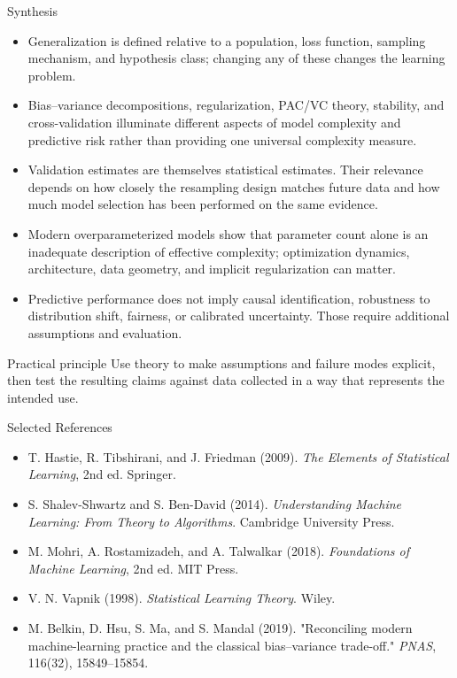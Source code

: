 \documentclass[aspectratio=169,11pt]{beamer}
\begin{document}
\begin{frame}{Synthesis}
  \begin{itemize}
    \item Generalization is defined relative to a population, loss function, sampling mechanism, and hypothesis class; changing any of these changes the learning problem.
    \item Bias--variance decompositions, regularization, PAC/VC theory, stability, and cross-validation illuminate different aspects of model complexity and predictive risk rather than providing one universal complexity measure.
    \item Validation estimates are themselves statistical estimates. Their relevance depends on how closely the resampling design matches future data and how much model selection has been performed on the same evidence.
    \item Modern overparameterized models show that parameter count alone is an inadequate description of effective complexity; optimization dynamics, architecture, data geometry, and implicit regularization can matter.
    \item Predictive performance does not imply causal identification, robustness to distribution shift, fairness, or calibrated uncertainty. Those require additional assumptions and evaluation.
  \end{itemize}

  \begin{alertblock}{Practical principle}
    Use theory to make assumptions and failure modes explicit, then test the resulting claims against data collected in a way that represents the intended use.
  \end{alertblock}
\end{frame}

\begin{frame}{Selected References}
  \small
  \begin{itemize}
    \item T. Hastie, R. Tibshirani, and J. Friedman (2009). \textit{The Elements of Statistical Learning}, 2nd ed. Springer.
    \item S. Shalev-Shwartz and S. Ben-David (2014). \textit{Understanding Machine Learning: From Theory to Algorithms}. Cambridge University Press.
    \item M. Mohri, A. Rostamizadeh, and A. Talwalkar (2018). \textit{Foundations of Machine Learning}, 2nd ed. MIT Press.
    \item V. N. Vapnik (1998). \textit{Statistical Learning Theory}. Wiley.
    \item M. Belkin, D. Hsu, S. Ma, and S. Mandal (2019). "Reconciling modern machine-learning practice and the classical bias--variance trade-off." \textit{PNAS}, 116(32), 15849--15854.
  \end{itemize}
\end{frame}

\contactslide
\end{document}
